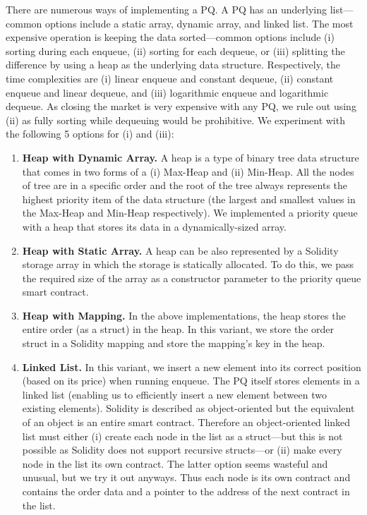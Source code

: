 There are numerous ways of implementing a PQ. A PQ has an underlying list---common options include a static array, dynamic array, and linked list. The most expensive operation is keeping the data sorted---common options include (i) sorting during each enqueue, (ii) sorting for each dequeue, or (iii) splitting the difference by using a heap as the underlying data structure. Respectively, the time complexities are (i) linear enqueue and constant dequeue, (ii) constant enqueue and linear dequeue, and (iii) logarithmic enqueue and logarithmic dequeue. As closing the market is very expensive with any PQ, we rule out using (ii) as fully sorting while dequeuing would be prohibitive. We experiment with the following 5 options for (i) and (iii):

\begin{enumerate}

\item \textbf{Heap with Dynamic Array.} A heap is a type of binary tree data structure that comes in two forms of a (i) Max-Heap and (ii) Min-Heap. All the nodes of tree are in a specific order and the root of the tree always represents the highest priority item of the data structure (the largest and smallest values in the Max-Heap and Min-Heap respectively). We implemented a priority queue with a heap that stores its data in a dynamically-sized array. 

\item \textbf{Heap with Static Array.} A heap can be also represented by a Solidity storage array in which the storage is statically allocated. To do this, we pass the required size of the array as a constructor parameter to the priority queue smart contract. 

\item \textbf{Heap with Mapping.} In the above implementations, the heap stores the entire order (as a struct) in the heap. In this variant, we store the order struct in a Solidity mapping and store the mapping's key in the heap.  

\item \textbf{Linked List.} In this variant, we insert a new element into its correct position (based on its price) when running enqueue. The PQ itself stores elements in a linked list (enabling us to efficiently insert a new element between two existing elements). Solidity is described as object-oriented but the equivalent of an object is an entire smart contract. Therefore an object-oriented linked list must either (i) create each node in the list as a struct---but this is not possible as Solidity does not support recursive structs---or (ii) make every node in the list its own contract. The latter option seems wasteful and unusual, but we try it out anyways. Thus each node is its own contract and contains the order data and a pointer to the address of the next contract in the list.


\end{enumerate}

